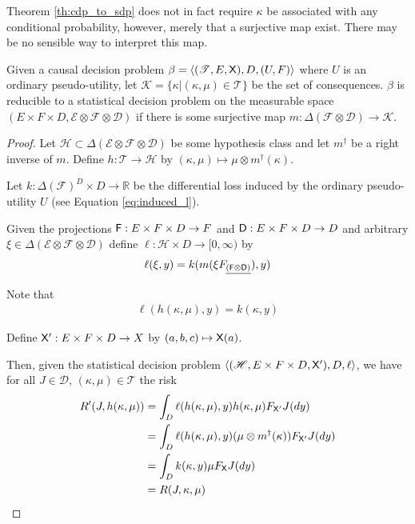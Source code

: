 Theorem \ref{th:cdp_to_sdp} does not in fact require $\kappa$ be associated with any conditional probability, however, merely that a surjective map exist. There may be no sensible way to interpret this map.

\begin{theorem}\label{th:red_cdp}
Given a causal decision problem $\beta=\langle (\mathscr{T},E,\mathsf{X}),D,(U,F)\rangle$ where $U$ is an ordinary pseudo-utility, let $\mathscr{K}=\{\kappa|(\kappa,\mu)\in \mathscr{T}\}$ be the set of consequences. $\beta$ is reducible to a statistical decision problem on the measurable space $(E\times F\times D,\mathcal{E}\otimes \mathcal{F}\otimes \mathcal{D})$ if there is some surjective map $m:\Delta(\mathcal{F}\otimes\mathcal{D})\to \mathscr{K}$.
\end{theorem}

\begin{proof}
Let $\mathscr{H}\subset \Delta(\mathcal{E}\otimes \mathcal{F}\otimes \mathcal{D})$ be some hypothesis class and let $m^\dagger$ be a right inverse of $m$. Define $h:\mathscr{T}\to \mathscr{H}$ by $(\kappa,\mu)\mapsto \mu \otimes m^{\dagger}(\kappa)$.

Let $k:\Delta(\mathcal{F})^D\times D\to \mathbb{R}$ be the differential loss induced by the ordinary pseudo-utility $U$ (see Equation \ref{eq:induced_l}).

Given the projections $\mathsf{F}:E\times F\times D\to F$ and $\mathsf{D}:E\times F \times D\to D$ and arbitrary $\xi\in\Delta(\mathcal{E}\otimes \mathcal{F} \otimes\mathcal{D})$ define $\ell:\mathscr{H}\times D\to [0,\infty)$ by
\begin{align}
    \ell(\xi,y) = k(m(\xi F_{\underline{(\mathsf{F}\otimes\mathsf{D})}}),y)
\end{align}

Note that
\begin{align}
    \ell(h(\kappa,\mu),y) = k(\kappa,y)
\end{align}

Define $\mathsf{X}':E\times F \times D\to X$ by $(a,b,c)\mapsto \mathsf{X}(a)$.

Then, given the statistical decision problem $\langle(\mathscr{H},E\times F\times D,\mathsf{X}'),D,\ell\rangle$, we have for all $J\in \mathscr{D}$, $(\kappa,\mu)\in\mathscr{T}$ the risk
\begin{align}
    R'(J,h(\kappa,\mu)) &= \int_D \ell (h(\kappa,\mu),y)  h(\kappa,\mu) F_{\mathsf{X}'} J(dy) \\
                        &= \int_D \ell (h(\kappa,\mu),y)  (\mu\otimes m^\dagger(\kappa)) F_{\mathsf{X}'} J(dy) \\
                        &= \int_D k(\kappa,y) \mu F_{\mathsf{X}} J(dy)\\
                        &= R(J,\kappa,\mu)
\end{align}
\end{proof}

